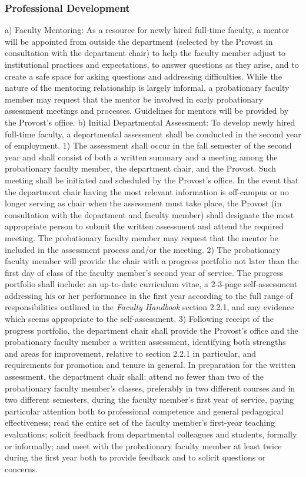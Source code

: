 \documentclass[letterpaper, 11pt]{article}
\begin{document}
		\subsubsection{Professional Development}
			a) Faculty Mentoring:  As a resource for newly hired full-time faculty, a mentor will be appointed from outside the department (selected by the Provost in consultation with the department chair) to help the faculty member adjust to institutional practices and expectations, to answer questions as they arise, and to create a safe space for asking questions and addressing difficulties.  While the nature of the mentoring relationship is largely informal, a probationary faculty member may request that the mentor be involved in early probationary assessment meetings and processes.  Guidelines for mentors will be provided by the Provost's office.
			b) Initial Departmental Assessment:  To develop newly hired full-time faculty, a departmental assessment shall be conducted in the second year of employment.
			1) The assessment shall occur in the fall semester of the second year and shall consist of both a written summary and a meeting among the probationary faculty member, the department chair, and the Provost.  Such meeting shall be initiated and scheduled by the Provost's office.  In the event that the department chair having the most relevant information is off-campus or no longer serving as chair when the assessment must take place, the Provost (in consultation with the department and faculty member) shall designate the most appropriate person to submit the written assessment and attend the required meeting.  The probationary faculty member may request that the mentor be included in the assessment process and/or the meeting.
			2) The probationary faculty member will provide the chair with a progress portfolio not later than the first day of class of the faculty member's second year of service. The progress portfolio shall include:  an up-to-date curriculum vitae, a 2-3-page self-assessment addressing his or her performance in the first year according to the full range of responsibilities outlined in the \emph{Faculty Handbook} section 2.2.1, and any evidence which seems appropriate to the self-assessment.
			3) Following receipt of the progress portfolio, the department chair shall provide the Provost's office and the probationary faculty member a written assessment, identifying both strengths and areas for improvement, relative to section 2.2.1 in particular, and requirements for promotion and tenure in general.  In preparation for the written assessment, the department chair shall:  attend no fewer than two of the probationary faculty member's classes, preferably in two different courses and in two different semesters, during the faculty member's first year of service, paying particular attention both to professional competence and general pedagogical effectiveness; read the entire set of the faculty member's first-year teaching evaluations; solicit feedback from departmental colleagues and students, formally or informally; and meet with the probationary faculty member at least twice during the first year both to provide feedback and to solicit questions or concerns.
\end{document}
